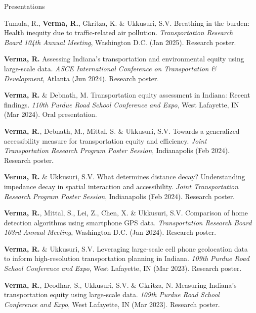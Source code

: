 \documentclass{CV} %
\begin{document}
\begin{rSection}{Presentations}
    \begin{etaremune}
        \item Tumula, R., \textbf{Verma, R.}, Gkritza, K. \& Ukkusuri, S.V. Breathing in the burden: Health inequity due to traffic-related air pollution. \textit{Transportation Research Board 104th Annual Meeting}, Washington D.C. (Jan 2025). Research poster.
        
        \item \textbf{Verma, R.} Assessing Indiana's transportation and environmental equity using large-scale data. \textit{ASCE International Conference on Transportation \& Development}, Atlanta (Jun 2024). Research poster.

        \item \textbf{Verma, R.} \& Debnath, M. Transportation equity assessment in Indiana: Recent findings. \textit{110th Purdue Road School Conference and Expo}, West Lafayette, IN (Mar 2024). Oral presentation.
        
        \item \textbf{Verma, R.}, Debnath, M., Mittal, S. \& Ukkusuri, S.V. Towards a generalized accessibility measure for transportation equity and efficiency. \textit{Joint Transportation Research Program Poster Session}, Indianapolis (Feb 2024). Research poster.
        
        \item \textbf{Verma, R.} \& Ukkusuri, S.V. What determines distance decay? Understanding impedance decay in spatial interaction and accessibility. \textit{Joint Transportation Research Program Poster Session}, Indianapolis (Feb 2024). Research poster.

        \item \textbf{Verma, R.}, Mittal, S., Lei, Z., Chen, X. \& Ukkusuri, S.V. Comparison of home detection algorithms using smartphone GPS data. \textit{Transportation Research Board 103rd Annual Meeting}, Washington D.C. (Jan 2024). Research poster.

        \item \textbf{Verma, R.} \& Ukkusuri, S.V. Leveraging large-scale cell phone geolocation data to inform high-resolution transportation planning in Indiana. \textit{109th Purdue Road School Conference and Expo}, West Lafayette, IN (Mar 2023). Research poster.

        \item \textbf{Verma, R.}, Deodhar, S., Ukkusuri, S.V. \& Gkritza, N. Measuring Indiana's transportation equity using large-scale data. \textit{109th Purdue Road School Conference and Expo}, West Lafayette, IN (Mar 2023). Research poster.


\end{etaremune}
\end{rSection}
\end{document}
